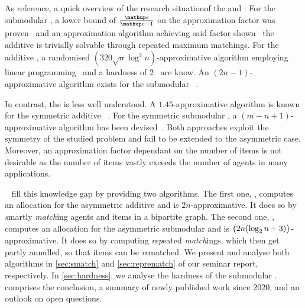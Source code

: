 As reference, a quick overview of the research situation\footnotemark[1] of the \USW{} and \ESW{}:
For the submodular \USW{}, a lower bound of \(\frac{\euler}{\euler - 1}\) on the approximation factor was proven~\cite{inapprox_results_for_combi_auctions_with_submod_utility_funcs} and an approximation algorithm achieving said factor shown~\cite{opt_approx_for_the_submod_nsw_in_the_value_oracle_model} \emdash{} the additive \USW{} is trivially solvable through repeated maximum matchings.
For the additive \ESW, a randomised \((320 \sqrt{n} \log^3 n)\)-approximative algorithm employing linear programming~\cite{an_approx_algo_for_maxmin_fair_alloc_of_indiv_goods} and a hardness of \(2\)~\cite{allocating_indiv_goods} are know.
An \((2n-1)\)-approximative algorithm exists for the submodular \ESW~\cite{approx_algo_for_the_maxmin_alloc_problem}.

In contrast, the \NSW{} is less well understood\footnotemark[1].
A \(1.45\)-approximative algorithm is known for the symmetric additive \NSW~\cite{finding_fair_and_efficient_allocs}.
For the symmetric submodular \NSW, a \((m - n + 1)\)-approximative algorithm has been devised~\cite{min_envy_and_max_avg_nsw_in_the_alloc_of_indiv_goods}.
Both approaches exploit the symmetry of the studied problem and fail to be extended to the asymmetric case.
Moreover, an approximation factor dependant on the number of items is not desirable as the number of items vastly exceeds the number of agents in many applications.

~\cite{APNSWuSVþUM} fill this knowledge gap by providing two algorithms.
The first one, \emph{\SMatch}, computes an allocation for the asymmetric additive \NSW{} and is \(2n\)-approximative.
It does so by \emph{s}martly \emph{match}ing agents and items in a bipartite graph.
The second one, \emph{\RepReMatch}, computes an allocation for the asymmetric submodular \NSW{} and is \(\paren[\big]{2n (\log_2 n + 3)}\)-approximative.
It does so by computing \emph{rep}eated \emph{match}ings, which then get partly annulled, so that items can be \emph{re}matched.
We present and analyse both algorithms in \cref{sec:smatch} and \cref{sec:reprematch} of our seminar report, respectively.
In \cref{sec:hardness}, we analyse the hardness of the submodular \NSW.
 comprises the conclusion, a summary of newly published work since 2020, and an outlook on open questions.


